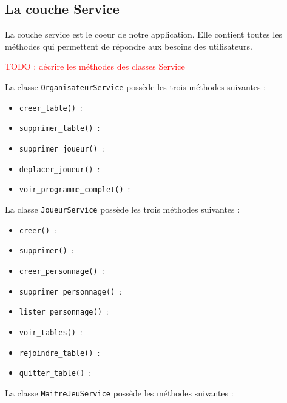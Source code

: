 \documentclass[11pt]{article}
\begin{document}
\subsection{La couche Service}

La couche service est le coeur de notre application. Elle contient toutes les méthodes qui permettent de répondre aux besoins des utilisateurs.



\textcolor{red}{TODO : décrire les méthodes des classes Service}


\bigbreak


La classe \texttt{OrganisateurService} possède les trois méthodes suivantes :
\begin{itemize}[label=, font=\small]
    \item \texttt{creer\_table()}~: 
    \item \texttt{supprimer\_table()}~: 
    \item \texttt{supprimer\_joueur()}~: 
    \item \texttt{deplacer\_joueur()}~: 
    \item \texttt{voir\_programme\_complet()}~: 
\end{itemize}

\bigbreak

La classe \texttt{JoueurService} possède les trois méthodes suivantes :
\begin{itemize}[label=, font=\small]
    \item \texttt{creer()}~: 
    \item \texttt{supprimer()}~: 
    \item \texttt{creer\_personnage()}~: 
    \item \texttt{supprimer\_personnage()}~: 
    \item \texttt{lister\_personnage()}~: 
    \item \texttt{voir\_tables()}~: 
    \item \texttt{rejoindre\_table()}~: 
    \item \texttt{quitter\_table()}~: 
\end{itemize}


\bigbreak


La classe \texttt{MaitreJeuService} possède les méthodes suivantes :
\end{document}
